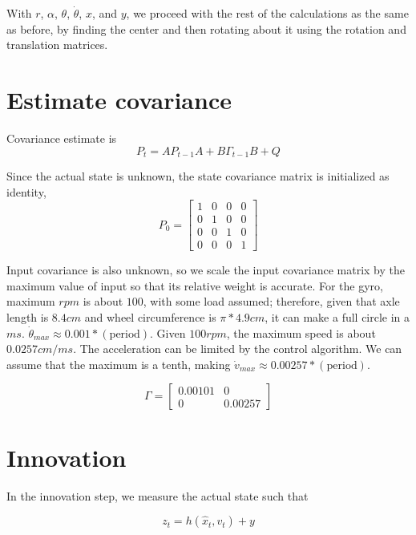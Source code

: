\documentclass[11pt]{article}
\begin{document}
With $r$, $\alpha$, $\theta$, $\dot{\theta}$, $x$, and $y$, we proceed with the rest of the calculations as the same as before, by finding the center and then rotating about it using the rotation and translation matrices.

\section{Estimate covariance}

Covariance estimate is
\begin{equation}
P_t = A P_{t-1} A + B \Gamma_{t-1} B + Q
\end{equation}

Since the actual state is unknown, the state covariance matrix is initialized as identity,
\begin{equation}
P_0 = \begin{bmatrix}
1 & 0 & 0 & 0 \\
0 & 1 & 0 & 0 \\
0 & 0 & 1 & 0 \\
0 & 0 & 0 & 1
\end{bmatrix}
\end{equation}

Input covariance is also unknown, so we scale the input covariance matrix by the maximum value of input so that its relative weight is accurate. For the gyro, maximum $rpm$ is about $100$, with some load assumed; therefore, given that axle length is $8.4cm$ and wheel circumference is $\pi * 4.9cm$, it can make a full circle in a $ms$. $\dot{\theta}_{max} \approx 0.001*\mathrm{(period)}$. Given $100 rpm$, the maximum speed is about $0.0257cm/ms$. The acceleration can be limited by the control algorithm. We can assume that the maximum is a tenth, making $\dot{v}_{max} \approx 0.00257*\mathrm{(period)}$.

\begin{equation}
\Gamma = \begin{bmatrix}
0.00101 & 0 \\
0 & 0.00257
\end{bmatrix}
\end{equation}

\section{Innovation}

In the innovation step, we measure the actual state such that 

\begin{equation}
z_t = h(\hat{x}_t, v_t) + y
\end{equation}
\end{document}
